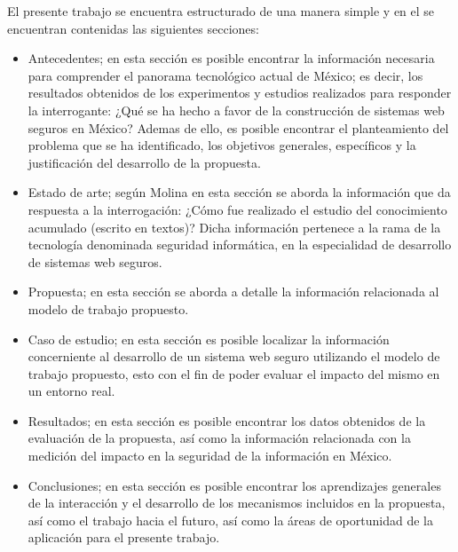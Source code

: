 \documentclass[runningheads,a4paper]{llncs}
\begin{document}
El presente trabajo se encuentra estructurado de una manera simple y en el se encuentran contenidas las siguientes secciones:

\begin{itemize}
	\item Antecedentes; en esta sección es posible encontrar la información necesaria para comprender el panorama tecnológico actual de México; es decir, los resultados obtenidos de los experimentos y estudios realizados para responder la interrogante: ¿Qué se ha hecho a favor de la construcción de sistemas web seguros en México? Ademas de ello, es posible encontrar el planteamiento del problema que se ha identificado, los objetivos generales, específicos y la justificación del desarrollo de la propuesta.\\
	
	\item Estado de arte; según Molina \cite{La_salle_1} en esta sección se aborda la información que da respuesta a la interrogación: ¿Cómo fue realizado el estudio del conocimiento acumulado (escrito en textos)? Dicha información pertenece a la rama de la tecnología denominada seguridad informática, en la especialidad de desarrollo de sistemas web seguros.\\
	
	\item Propuesta; en esta sección se aborda a detalle la información relacionada al modelo de trabajo propuesto.\\
	
	\item Caso de estudio; en esta sección es posible localizar la información concerniente al desarrollo de un sistema web seguro utilizando el modelo de trabajo propuesto, esto con el fin de poder evaluar el impacto del mismo en un entorno real. \\
	
	\item Resultados; en esta sección es posible encontrar los datos obtenidos de la evaluación de la propuesta, así como la información relacionada con la medición del impacto en la seguridad de la información en México.\\
	
	\item Conclusiones; en esta sección es posible encontrar los aprendizajes generales de la interacción y el desarrollo de los mecanismos incluidos en la propuesta, así como el trabajo hacia el futuro, así como la áreas de oportunidad de la aplicación para el presente trabajo.
\end{itemize} 


\printnoidxglossaries     
         


\end{document}
